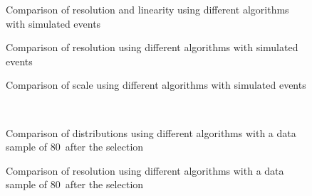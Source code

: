 \begin{figure}
\caption{Comparison of \met resolution and linearity using different \met algorithms with simulated \Wen events} \label{fig:mc_algs_met_resolution_wenu}
\end{figure}

\begin{figure}
\caption{Comparison of \met resolution using different \met algorithms with simulated \Zmm events} \label{fig:mc_algs_met_resolution_zmumu}
\end{figure}

\begin{figure}
\caption{Comparison of \met scale using different \met algorithms with simulated \Zmm events} \label{fig:mc_algs_met_scale_zmumu}
\end{figure}

\begin{figure}
\caption{Comparison of \met distributions using different \met algorithms with a data sample of 80~\ipb after the \Zmm selection} \label{fig:data_algs_met_zmumu}
 \\
\end{figure}


\begin{figure}
\caption{Comparison of \met resolution using different \met algorithms with a data sample of 80~\ipb after the \Zmm selection} \label{fig:data_algs_met_resolution_zmumu}
\end{figure}
